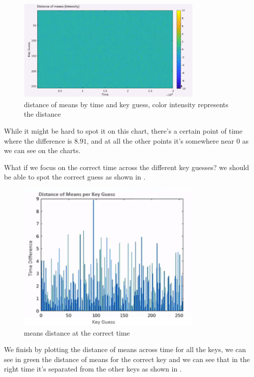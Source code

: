 \begin{figure}[!ht]
    \centering
    \includegraphics[width=0.8\textwidth]{images/Lecture6/intensity_represents_means_diff.png}
    \caption{distance of means by time and key guess, color intensity represents the distance} \label{fig:intensity_represents_means_diff}
\end{figure}

While it might be hard to spot it on this chart, there's a certain point of time
where the difference is $8.91$, and at all the other points it's somewhere near
0 as we can see on the charts.

What if we focus on the correct time across the different key guesses? we should
be able to spot the correct guess as shown in .

\begin{figure}[!ht]
    \centering
    \includegraphics[width=0.8\textwidth]{images/Lecture6/the-correct-time.png}
    \caption{means distance at the correct time} \label{fig:the-correct-time}
\end{figure}

We finish by plotting the distance of means across time for all the keys, we can
see in green the distance of means for the correct key and we can see that in
the right time it's separated from the other keys as shown in .

